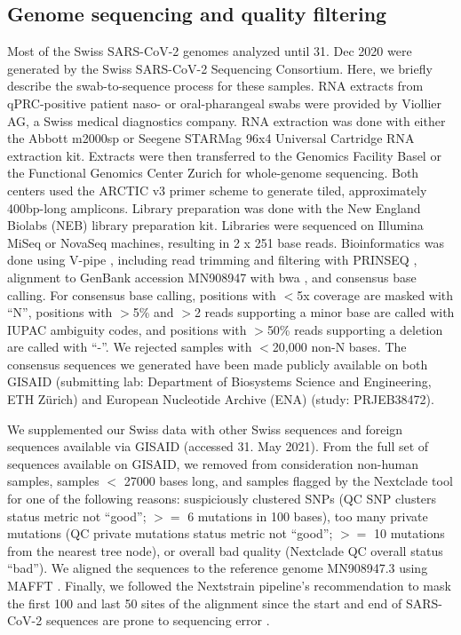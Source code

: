 \documentclass[9pt,twoside,lineno]{pnas-new} %
\begin{document}
\subsection*{Genome sequencing and quality filtering}
Most of the Swiss SARS-CoV-2 genomes analyzed until 31. Dec 2020 were generated by the Swiss SARS-CoV-2 Sequencing Consortium. Here, we briefly describe the swab-to-sequence process for these samples. RNA extracts from qPRC-positive patient naso- or oral-pharangeal swabs were provided by Viollier AG, a Swiss medical diagnostics company. RNA extraction was done with either the Abbott m2000sp or Seegene STARMag 96x4 Universal Cartridge RNA extraction kit. Extracts were then  transferred to the Genomics Facility Basel or the Functional Genomics Center Zurich for whole-genome sequencing. Both centers used the ARCTIC v3 primer scheme \cite{Quick2017, ARCTICNetwork} to generate tiled, approximately 400bp-long amplicons. Library preparation was done with the New England Biolabs (NEB) library preparation kit. Libraries were sequenced on Illumina MiSeq or NovaSeq machines, resulting in 2 x 251 base reads. Bioinformatics was done using V-pipe \cite{Posada-Cespedes2020}, including read trimming and filtering with PRINSEQ \cite{Schmieder2011}, alignment to GenBank accession MN908947 \cite{Wu2020} with bwa \cite{Li2009}, and consensus base calling. For consensus base calling, positions with $<$5x coverage are masked with ``N'', positions with $>$5\% and $>$2 reads supporting a minor base are called with IUPAC ambiguity codes, and positions with $>$50\% reads supporting a deletion are called with ``-''. We rejected samples with $<$20,000 non-N bases. The consensus sequences we generated have been made publicly available on both GISAID (submitting lab: Department of Biosystems Science and Engineering, ETH Zürich) and European Nucleotide Archive (ENA) (study: PRJEB38472).

We supplemented our Swiss data with other Swiss sequences and foreign sequences available via GISAID (accessed 31. May 2021). From the full set of sequences available on GISAID, we removed from consideration non-human samples, samples $<$ 27000 bases long, and samples flagged by the Nextclade tool \cite{Aksamentov} for one of the following reasons: suspiciously clustered SNPs (QC SNP clusters status metric not ``good''; $>=$ 6 mutations in 100 bases), too many private mutations (QC private mutations status metric not ``good''; $>=$ 10 mutations from the nearest tree node), or overall bad quality (Nextclade QC overall status ``bad''). We aligned the sequences to the reference genome MN908947.3 using MAFFT \cite{katoh_mafft:_2002}. Finally, we followed the Nextstrain pipeline's recommendation to mask the first 100 and last 50 sites of the alignment \cite{Nextstraina} since the start and end of SARS-CoV-2 sequences are prone to sequencing error \cite{DeMaio2020}.
\end{document}
